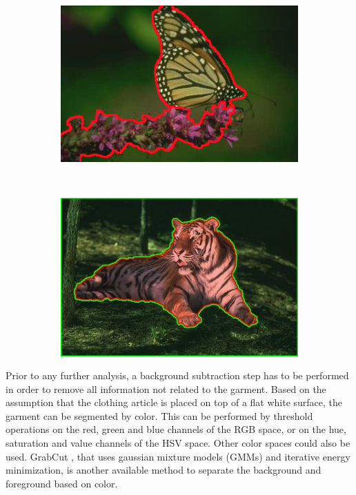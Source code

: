 \begin{figure}[htbp]
	\centering
    \begin{subfigure}[l]{0.49\textwidth}
        \centering
    	\includegraphics[width=\textwidth]
    	{figures/Background-segmentation-01.png}
        \end{subfigure}
        ~
        \begin{subfigure}[r]{0.49\textwidth}
	        \centering
    		\includegraphics[width=\textwidth]
    		{figures/Background-segmentation-02.jpg}
		\end{subfigure} 
    \caption{}
    \label{fig:generic_garment_segmentation}
\end{figure}


Prior to any further analysis, a background subtraction step has to be performed in order to remove all information not related to the garment. Based on the assumption that the clothing article is placed on top of a flat white surface, the garment can be segmented by color. This can be performed by threshold operations on the red, green and blue channels of the RGB space, or on the hue, saturation and value channels of the HSV space. Other color spaces could also be used. GrabCut , that uses gaussian mixture models (GMMs) and iterative energy minimization, is another available method to separate the background and foreground based on color.

